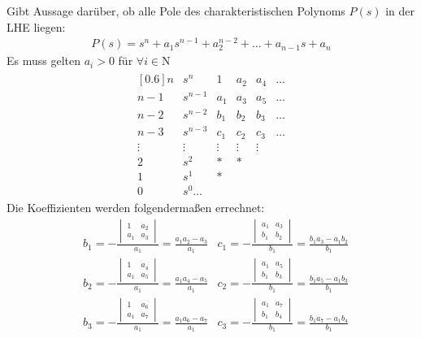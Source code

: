\begin{tcolorbox}[colback=white!10!white,colframe=green!30!black,title=Routh Kriterium] 
    Gibt Aussage darüber, ob alle Pole des charakteristischen Polynoms $P(s)$ in der LHE liegen:
    \begin{align*}
    P(s) = s^n + a_1s^{n-1}+a_2^{n-2}+\ldots + a_{n-1}s+a_n
    \end{align*}
    Es muss gelten $a_i > 0$ für $\forall i \in \mathrm{N}$
    \begin{align*}
        \begin{matrix}[0.6]
        n & s^n & 1 & a_2 & a_4 & \ldots \\
        n-1 & s^{n-1} & a_1 & a_3 & a_5 & \ldots \\
        n-2 & s^{n-2} & b_1 & b_2 & b_3 & \ldots \\        
        n-3 & s^{n-3} & c_1 & c_2 & c_3 & \ldots \\
        \vdots & \vdots & \vdots & \vdots & \vdots  \\
        2 & s^2 & * & *  \\
        1 & s^1 & * \\
        0 & s^0 \ldots 
        \end{matrix}
    \end{align*}
    Die Koeffizienten werden folgendermaßen errechnet:
    \begin{align*}
        & b_1 = -\frac{\begin{vmatrix}
            1 & a_2 \\ a_1 & a_3
            \end{vmatrix}}{a_1} = \frac{a_1a_2-a_3}{a_1} & c_1 = -\frac{\begin{vmatrix}
            a_1 & a_3 \\ b_1 & b_2
            \end{vmatrix}}{b_1} = \frac{b_1a_3-a_1b_2}{b_1}\\
        & b_2 = -\frac{\begin{vmatrix}
            1 & a_4 \\ a_1 & a_5
            \end{vmatrix}}{a_1} = \frac{a_1a_4-a_5}{a_1} & c_2 = -\frac{\begin{vmatrix}
            a_1 & a_5 \\ b_1 & b_3
            \end{vmatrix}}{b_1} = \frac{b_1a_5-a_1b_3}{b_1}\\
        & b_3 = -\frac{\begin{vmatrix}
            1 & a_6 \\ a_1 & a_7
            \end{vmatrix}}{a_1} = \frac{a_1a_6-a_7}{a_1} & c_3 = -\frac{\begin{vmatrix}
            a_1 & a_7 \\ b_1 & b_4
            \end{vmatrix}}{b_1} = \frac{b_1a_7-a_1b_4}{b_1}
    \end{align*}
    

\end{tcolorbox}
